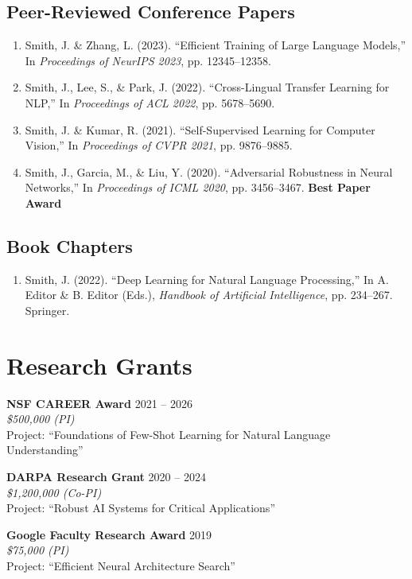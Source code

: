 \documentclass[11pt,letterpaper]{article}
\newcommand{\cventry}[4]{%
  \noindent\textbf{#1} \hfill #2\\
  \textit{#3}\\
  #4
  \vspace{0.3cm}
}
\begin{document}
\subsection{Peer-Reviewed Conference Papers}

\begin{enumerate}[leftmargin=*]
  \item Smith, J. \& Zhang, L. (2023). ``Efficient Training of Large Language Models,'' In \textit{Proceedings of NeurIPS 2023}, pp. 12345--12358.

  \item Smith, J., Lee, S., \& Park, J. (2022). ``Cross-Lingual Transfer Learning for NLP,'' In \textit{Proceedings of ACL 2022}, pp. 5678--5690.

  \item Smith, J. \& Kumar, R. (2021). ``Self-Supervised Learning for Computer Vision,'' In \textit{Proceedings of CVPR 2021}, pp. 9876--9885.

  \item Smith, J., Garcia, M., \& Liu, Y. (2020). ``Adversarial Robustness in Neural Networks,'' In \textit{Proceedings of ICML 2020}, pp. 3456--3467. \textbf{Best Paper Award}
\end{enumerate}

\subsection{Book Chapters}

\begin{enumerate}[leftmargin=*]
  \item Smith, J. (2022). ``Deep Learning for Natural Language Processing,'' In A. Editor \& B. Editor (Eds.), \textit{Handbook of Artificial Intelligence}, pp. 234--267. Springer.
\end{enumerate}

\section{Research Grants}

\cventry{NSF CAREER Award}{2021 -- 2026}
{\$500,000 (PI)}
{Project: ``Foundations of Few-Shot Learning for Natural Language Understanding''}

\cventry{DARPA Research Grant}{2020 -- 2024}
{\$1,200,000 (Co-PI)}
{Project: ``Robust AI Systems for Critical Applications''}

\cventry{Google Faculty Research Award}{2019}
{\$75,000 (PI)}
{Project: ``Efficient Neural Architecture Search''}
\end{document}
